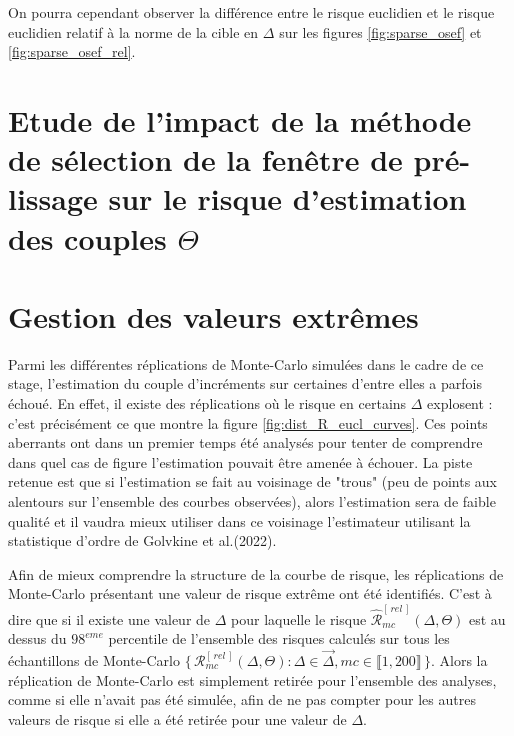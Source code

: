 On pourra cependant observer la différence entre le risque euclidien et le risque euclidien relatif à la norme de la cible en $\Delta$ sur les figures \ref{fig:sparse_osef} et \ref{fig:sparse_osef_rel}.

\section{Etude de l'impact de la méthode de sélection de la fenêtre de pré-lissage sur le risque d'estimation des couples $\Theta$}


% 




\section{Gestion des valeurs extrêmes}

Parmi les différentes réplications de Monte-Carlo simulées dans le cadre de ce stage, l'estimation du couple d'incréments sur certaines d'entre elles a parfois échoué. En effet, il existe des réplications où le risque en certains $\Delta$ explosent : c'est précisément ce que montre la figure \ref{fig:dist_R_eucl_curves}. Ces points aberrants ont dans un premier temps été analysés pour tenter de comprendre dans quel cas de figure l'estimation pouvait être amenée à échouer. La piste retenue est que si l'estimation se fait au voisinage de "trous" (peu de points aux alentours sur l'ensemble des courbes observées), alors l'estimation sera de faible qualité et il vaudra mieux utiliser dans ce voisinage l'estimateur utilisant la statistique d'ordre de Golvkine et al.(2022). 

\smallskip

Afin de mieux comprendre la structure de la courbe de risque, les réplications de Monte-Carlo présentant une valeur de risque extrême ont été identifiés. C'est à dire que si il existe une valeur de $\Delta$ pour laquelle le risque $\widehat{\mathcal R}^{[\,rel\,]}_{mc}(\Delta, \Theta)$ est au dessus du $98^{eme}$ percentile de l'ensemble des risques calculés sur tous les échantillons de Monte-Carlo $\bigl\{ \,\mathcal R^{[\,rel\,]}_{mc}(\Delta, \Theta) : \Delta \in \overrightarrow{\Delta}, mc \in \llbracket 1, 200 \rrbracket \, \bigr\}$. Alors la réplication de Monte-Carlo est simplement retirée pour l'ensemble des analyses, comme si elle n'avait pas été simulée, afin de ne pas compter pour les autres valeurs de risque si elle a été retirée pour une valeur de $\Delta$.

